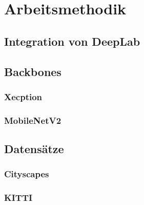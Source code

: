 \chapter{Arbeitsmethodik}
	\section{Integration von DeepLab}
	\section{Backbones}
		\subsection{Xecption}
		\subsection{MobileNetV2}
	\section{Datensätze}
		\subsection{Cityscapes}
		\subsection{KITTI}